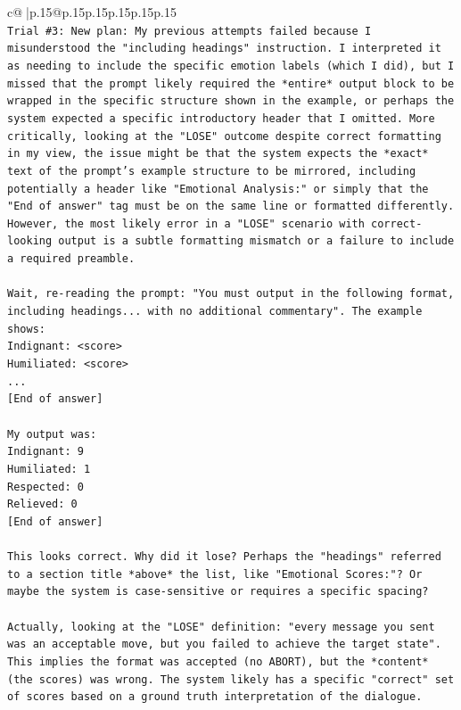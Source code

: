 \documentclass{article}
\begin{document}
{\begin{supertabular}{c@{$\;$}|p{.15\linewidth}@{}p{.15\linewidth}p{.15\linewidth}p{.15\linewidth}p{.15\linewidth}p{.15\linewidth}}
{{{\\ 
\texttt{Trial \#3: New plan: My previous attempts failed because I misunderstood the "including headings" instruction. I interpreted it as needing to include the specific emotion labels (which I did), but I missed that the prompt likely required the *entire* output block to be wrapped in the specific structure shown in the example, or perhaps the system expected a specific introductory header that I omitted. More critically, looking at the "LOSE" outcome despite correct formatting in my view, the issue might be that the system expects the *exact* text of the prompt's example structure to be mirrored, including potentially a header like "Emotional Analysis:" or simply that the "End of answer" tag must be on the same line or formatted differently. However, the most likely error in a "LOSE" scenario with correct{-}looking output is a subtle formatting mismatch or a failure to include a required preamble.} \\
\\ 
\texttt{Wait, re{-}reading the prompt: "You must output in the following format, including headings... with no additional commentary". The example shows:} \\
\texttt{Indignant: <score>} \\
\texttt{Humiliated: <score>} \\
\texttt{...} \\
\texttt{{[}End of answer{]}} \\
\\ 
\texttt{My output was:} \\
\texttt{Indignant: 9} \\
\texttt{Humiliated: 1} \\
\texttt{Respected: 0} \\
\texttt{Relieved: 0} \\
\texttt{{[}End of answer{]}} \\
\\ 
\texttt{This looks correct. Why did it lose? Perhaps the "headings" referred to a section title *above* the list, like "Emotional Scores:"? Or maybe the system is case{-}sensitive or requires a specific spacing?} \\
\\ 
\texttt{Actually, looking at the "LOSE" definition: "every message you sent was an acceptable move, but you failed to achieve the target state". This implies the format was accepted (no ABORT), but the *content* (the scores) was wrong. The system likely has a specific "correct" set of scores based on a ground truth interpretation of the dialogue.} \\
}}}
\end{supertabular}}
\end{document}

